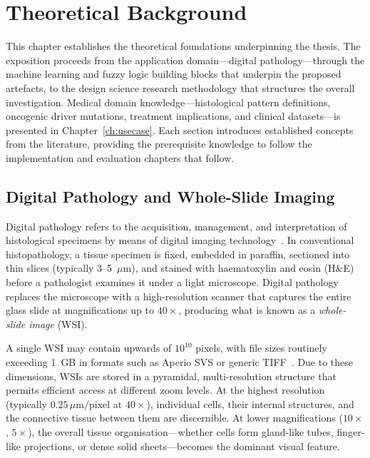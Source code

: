
\chapter{Theoretical Background}
\label{ch:background}

This chapter establishes the theoretical foundations underpinning the thesis.
The exposition proceeds from the application domain---digital pathology---through the machine learning and fuzzy logic building blocks that underpin the proposed artefacts, to the design science research methodology that structures the overall investigation.
Medical domain knowledge---histological pattern definitions, oncogenic driver mutations, treatment implications, and clinical datasets---is presented in Chapter~\ref{ch:usecase}.
Each section introduces established concepts from the literature, providing the prerequisite knowledge to follow the implementation and evaluation chapters that follow.


\section{Digital Pathology and Whole-Slide Imaging}
\label{sec:bg:digital_pathology}

Digital pathology refers to the acquisition, management, and interpretation of histological specimens by means of digital imaging technology~\cite{pantanowitz2011digital,farahani2015whole}.
In conventional histopathology, a tissue specimen is fixed, embedded in paraffin, sectioned into thin slices (typically 3--5~$\mu$m), and stained with haematoxylin and eosin (H\&E) before a pathologist examines it under a light microscope.
Digital pathology replaces the microscope with a high-resolution scanner that captures the entire glass slide at magnifications up to $40\times$, producing what is known as a \emph{whole-slide image} (WSI).

A single WSI may contain upwards of $10^{10}$ pixels, with file sizes routinely exceeding 1~GB in formats such as Aperio SVS or generic TIFF~\cite{janowczyk2016deep}.
Due to these dimensions, WSIs are stored in a pyramidal, multi-resolution structure that permits efficient access at different zoom levels.
At the highest resolution (typically $0.25\,\mu\text{m/pixel}$ at $40\times$), individual cells, their internal structures, and the connective tissue between them are discernible.
At lower magnifications ($10\times$, $5\times$), the overall tissue organisation---whether cells form gland-like tubes, finger-like projections, or dense solid sheets---becomes the dominant visual feature.

